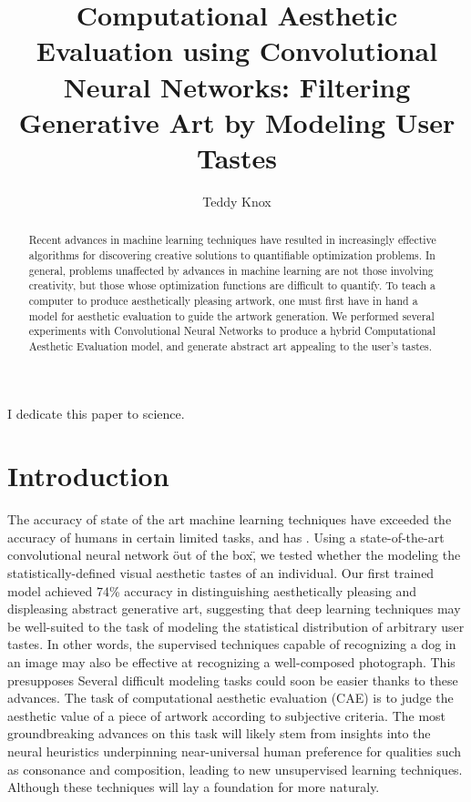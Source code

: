 \documentclass[midd]{thesis}
\title {Computational Aesthetic Evaluation using Convolutional Neural Networks: Filtering Generative Art by Modeling User Tastes}
\author {Teddy Knox}
\begin{document}
\maketitle

\begin{abstract}
Recent advances in machine learning techniques have resulted in increasingly effective algorithms for discovering creative solutions to quantifiable optimization problems. In general, problems unaffected by advances in machine learning are not those involving creativity, but those whose optimization functions are difficult to quantify. To teach a computer to produce aesthetically pleasing artwork, one must first have in hand a model for aesthetic evaluation to guide the artwork generation. We performed several experiments with Convolutional Neural Networks to produce a hybrid Computational Aesthetic Evaluation model, and generate abstract art appealing to the user's tastes.
\end{abstract}

\begin{acknowledgements}
I dedicate this paper to science.
\end{acknowledgements}

\contentspage
\tablelistpage
\figurelistpage

\normalspacing \setcounter{page}{1} 

\chapter{Introduction}
\label{sec:intro}

The accuracy of state of the art machine learning techniques have exceeded the accuracy of humans in certain limited tasks, and has . Using a state-of-the-art convolutional neural network \"out of the box\", we tested whether the modeling the statistically-defined visual aesthetic tastes of an individual. Our first trained model achieved 74\% accuracy in distinguishing aesthetically pleasing and displeasing abstract generative art, suggesting that deep learning techniques may be well-suited to the task of modeling the statistical distribution of arbitrary user tastes. In other words, the supervised techniques capable of recognizing a dog in an image may also be effective at recognizing a well-composed photograph. This presupposes Several difficult modeling tasks could soon be easier thanks to these advances. The task of computational aesthetic evaluation (CAE) is to judge the aesthetic value of a piece of artwork according to subjective criteria. The most groundbreaking advances on this task will likely stem from insights into the neural heuristics underpinning near-universal human preference for qualities such as consonance and composition, leading to new unsupervised learning techniques. Although these techniques will lay a foundation for more naturaly.
\end{document}
